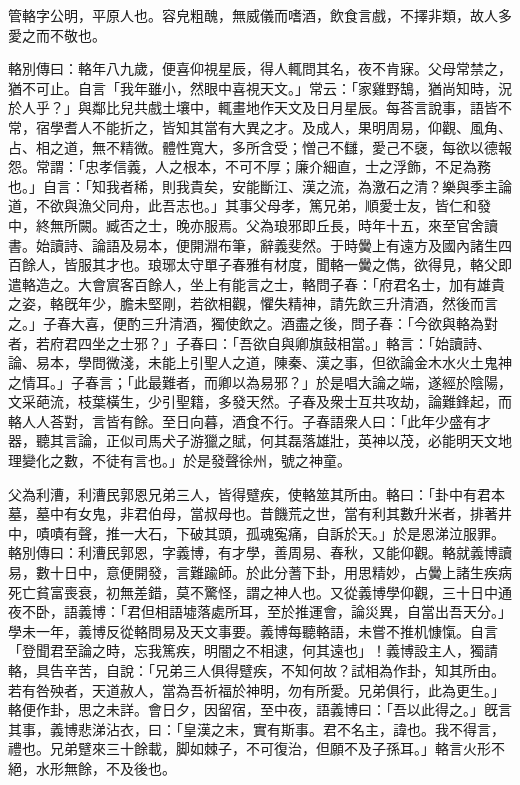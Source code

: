 
\begin{pinyinscope}
管輅字公明，平原人也。容皃粗醜，無威儀而嗜酒，飲食言戲，不擇非類，故人多愛之而不敬也。

輅別傳曰：輅年八九歲，便喜仰視星辰，得人輒問其名，夜不肯寐。父母常禁之，猶不可止。自言「我年雖小，然眼中喜視天文。」常云：「家雞野鵠，猶尚知時，況於人乎？」與鄰比兒共戲土壤中，輒畫地作天文及日月星辰。每荅言說事，語皆不常，宿學耆人不能折之，皆知其當有大異之才。及成人，果明周易，仰觀、風角、占、相之道，無不精微。體性寬大，多所含受；憎己不讎，愛己不襃，每欲以德報怨。常謂：「忠孝信義，人之根本，不可不厚；廉介細直，士之浮飾，不足為務也。」自言：「知我者稀，則我貴矣，安能斷江、漢之流，為激石之清？樂與季主論道，不欲與漁父同舟，此吾志也。」其事父母孝，篤兄弟，順愛士友，皆仁和發中，終無所闕。臧否之士，晚亦服焉。父為琅邪即丘長，時年十五，來至官舍讀書。始讀詩、論語及易本，便開淵布筆，辭義斐然。于時黌上有遠方及國內諸生四百餘人，皆服其才也。琅琊太守單子春雅有材度，聞輅一黌之儁，欲得見，輅父即遣輅造之。大會賔客百餘人，坐上有能言之士，輅問子春：「府君名士，加有雄貴之姿，輅旣年少，膽未堅剛，若欲相觀，懼失精神，請先飲三升清酒，然後而言之。」子春大喜，便酌三升清酒，獨使飲之。酒盡之後，問子春：「今欲與輅為對者，若府君四坐之士邪？」子春曰：「吾欲自與卿旗鼓相當。」輅言：「始讀詩、論、易本，學問微淺，未能上引聖人之道，陳秦、漢之事，但欲論金木水火土鬼神之情耳。」子春言；「此最難者，而卿以為易邪？」於是唱大論之端，遂經於陰陽，文采葩流，枝葉橫生，少引聖籍，多發天然。子春及衆士互共攻劫，論難鋒起，而輅人人荅對，言皆有餘。至日向暮，酒食不行。子春語衆人曰：「此年少盛有才器，聽其言論，正似司馬犬子游獵之賦，何其磊落雄壯，英神以茂，必能明天文地理變化之數，不徒有言也。」於是發聲徐州，號之神童。

父為利漕，利漕民郭恩兄弟三人，皆得躄疾，使輅筮其所由。輅曰：「卦中有君本墓，墓中有女鬼，非君伯母，當叔母也。昔饑荒之世，當有利其數升米者，排著井中，嘖嘖有聲，推一大石，下破其頭，孤魂寃痛，自訴於天。」於是恩涕泣服罪。輅別傳曰：利漕民郭恩，字義博，有才學，善周易、春秋，又能仰觀。輅就義博讀易，數十日中，意便開發，言難踰師。於此分蓍下卦，用思精妙，占黌上諸生疾病死亡貧富喪衰，初無差錯，莫不驚怪，謂之神人也。又從義博學仰觀，三十日中通夜不卧，語義博：「君但相語墟落處所耳，至於推運會，論災異，自當出吾天分。」學未一年，義博反從輅問易及天文事要。義博每聽輅語，未嘗不推机慷愾。自言「登聞君至論之時，忘我篤疾，明闇之不相逮，何其遠也」！義博設主人，獨請輅，具告辛苦，自說：「兄弟三人俱得躄疾，不知何故？試相為作卦，知其所由。若有咎殃者，天道赦人，當為吾祈福於神明，勿有所愛。兄弟俱行，此為更生。」輅便作卦，思之未詳。會日夕，因留宿，至中夜，語義博曰：「吾以此得之。」旣言其事，義博悲涕沾衣，曰：「皇漢之末，實有斯事。君不名主，諱也。我不得言，禮也。兄弟躄來三十餘載，脚如棘子，不可復治，但願不及子孫耳。」輅言火形不絕，水形無餘，不及後也。


\end{pinyinscope}
